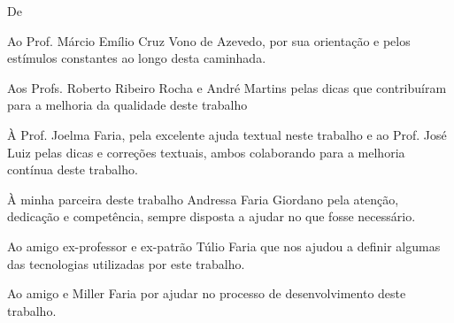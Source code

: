 \begin{agradecimentos}
\vspace*{\fill}
De \imprimirAutorDois
\newline

\par Ao Prof. Márcio Emílio Cruz Vono de Azevedo, por sua orientação e pelos estímulos constantes ao longo desta caminhada.

\par Aos Profs. Roberto Ribeiro Rocha e André Martins pelas dicas que contribuíram para a melhoria da qualidade deste trabalho 

\par À Prof. Joelma Faria, pela excelente ajuda textual neste trabalho e ao Prof. José Luiz pelas dicas e correções textuais, ambos colaborando para a melhoria contínua deste trabalho.

\par À minha parceira deste trabalho Andressa Faria Giordano pela atenção, dedicação e competência, sempre disposta a ajudar no que fosse necessário.

\par Ao amigo ex-professor e ex-patrão Túlio Faria que nos ajudou a definir algumas das tecnologias utilizadas por este trabalho.

\par Ao amigo e Miller Faria por ajudar no processo de desenvolvimento deste trabalho.

\end{agradecimentos}




